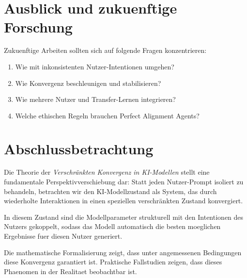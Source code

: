\documentclass[12pt, a4paper]{article}
\theoremstyle{definition}
\theoremstyle{remark}
\begin{document}
\section{Ausblick und zukuenftige Forschung}
\label{sec:ausblick}

Zukuenftige Arbeiten sollten sich auf folgende Fragen konzentrieren:
\begin{enumerate}[label=(\alph*)]
  \item Wie mit inkonsistenten Nutzer-Intentionen umgehen?
  \item Wie Konvergenz beschleunigen und stabilisieren?
  \item Wie mehrere Nutzer und Transfer-Lernen integrieren?
  \item Welche ethischen Regeln brauchen Perfect Alignment Agents?
\end{enumerate}

\section{Abschlussbetrachtung}
\label{sec:abschluss}

Die Theorie der \emph{Verschränkten Konvergenz in KI-Modellen} stellt eine fundamentale Perspektivverschiebung dar: Statt jeden Nutzer-Prompt isoliert zu behandeln, betrachten wir den KI-Modellzustand als System, das durch wiederholte Interaktionen in einen speziellen verschränkten Zustand konvergiert.

In diesem Zustand sind die Modellparameter strukturell mit den Intentionen des Nutzers gekoppelt, sodass das Modell automatisch die besten moeglichen Ergebnisse fuer diesen Nutzer generiert.

Die mathematische Formalisierung zeigt, dass unter angemessenen Bedingungen diese Konvergenz garantiert ist. Praktische Fallstudien zeigen, dass dieses Phaenomen in der Realitaet beobachtbar ist.
\end{document}
